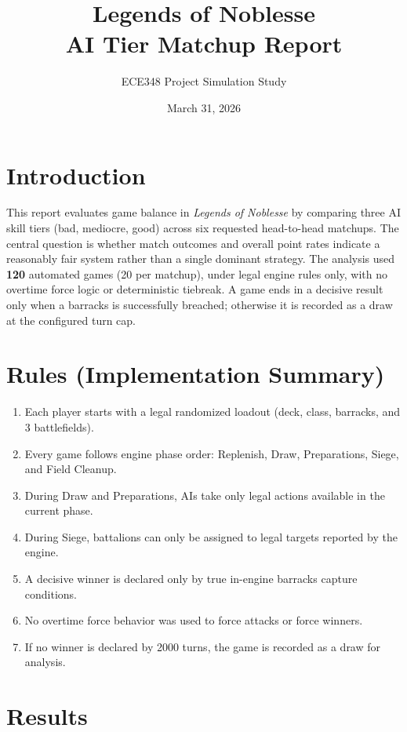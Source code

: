\documentclass[12pt]{article}
\title{Legends of Noblesse\\AI Tier Matchup Report}
\author{ECE348 Project Simulation Study}
\date{March 31, 2026}
\begin{document}
\maketitle
\section{Introduction}
This report evaluates game balance in \textit{Legends of Noblesse} by comparing three AI skill tiers (bad, mediocre, good) across six requested head-to-head matchups. The central question is whether match outcomes and overall point rates indicate a reasonably fair system rather than a single dominant strategy.
The analysis used \textbf{120} automated games (20 per matchup), under legal engine rules only, with no overtime force logic or deterministic tiebreak. A game ends in a decisive result only when a barracks is successfully breached; otherwise it is recorded as a draw at the configured turn cap.
\section{Rules (Implementation Summary)}
\begin{enumerate}
\item Each player starts with a legal randomized loadout (deck, class, barracks, and 3 battlefields).
\item Every game follows engine phase order: Replenish, Draw, Preparations, Siege, and Field Cleanup.
\item During Draw and Preparations, AIs take only legal actions available in the current phase.
\item During Siege, battalions can only be assigned to legal targets reported by the engine.
\item A decisive winner is declared only by true in-engine barracks capture conditions.
\item No overtime force behavior was used to force attacks or force winners.
\item If no winner is declared by 2000 turns, the game is recorded as a draw for analysis.
\end{enumerate}
\section{Results}
\end{document}
